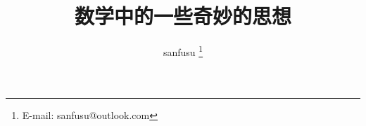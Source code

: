 \documentclass{ctexart}
\theoremstyle{definition} \newtheorem{question}{题}[section]
\theoremstyle{definition} \newtheorem{exposition}{述}[section]
\theoremstyle{definition} \newtheorem{note}{记}[section]
\begin{document}
\title{数学中的一些奇妙的思想}
\author{sanfusu \thanks{E-mail: sanfusu@outlook.com}}
\maketitle




\end{document}
